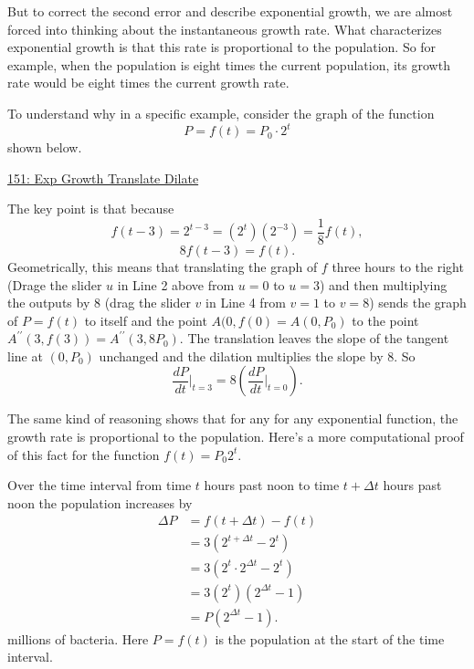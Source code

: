 \documentclass{ximera}
\begin{document}
But to correct the second error and describe exponential growth, we are almost forced into thinking about the instantaneous growth rate. What characterizes exponential growth is that this rate is proportional to the population. So for example, when the population is eight times the current population, its growth rate would be eight times the current growth rate.

To understand why in a specific example, consider the graph of the function
\[
     P = f(t)  = P_0 \cdot 2^t  
\]
shown below. 

\href{https://www.desmos.com/calculator/dmdpvei3d6}{151: Exp Growth Translate Dilate} 
 
\begin{onlineOnly}
    \begin{center}
\end{center}
\end{onlineOnly}



The key point is that because
\[
 f(t-3) =  2^{t-3} = (2^t)(2^{-3}) = \frac{1}{8} f(t) , 
\]
\[
      8 f(t-3) = f(t).
\]
Geometrically, this means that translating the graph of $f$ three hours to the right (Drage the slider $u$ in Line 2 above from $u=0$ to $u=3$) and then multiplying the outputs by $8$ (drag the slider $v$ in Line 4 from $v=1$ to $v=8$) sends the graph of $P=f(t)$ to itself and the point $A(0,f(0) = A(0,P_0)$ to the point $A^{\prime\prime}(3,f(3)) = A^{\prime\prime}(3,8P_0)$. The translation leaves the slope of the tangent line at $(0,P_0)$ unchanged and the dilation multiplies the slope by $8$. So
\[
  \frac{dP}{dt}\Big|_{t=3} = 8 \left( \frac{dP}{dt}\Big|_{t=0} \right).
\]

The same kind of reasoning shows that for any for any exponential function, the growth rate is proportional to the population. Here's a more computational proof of this fact for the function $f(t)=P_0 2^t$.


Over the time interval from time $t$ hours past noon to time $t+\Delta t$ hours past noon the population increases by 
\begin{align*}
  \Delta P &=  f(t + \Delta t) - f(t)  \\ 
                               &=  3 (2^{t+\Delta t} - 2^t) \\
                               &=  3 (2^t \cdot 2^{\Delta t} - 2^t) \\
                               &=  3 (2^t) (2^{\Delta t} - 1)  \\
                               &= P (2^{\Delta t} - 1) .
\end{align*}
millions of bacteria. Here $P=f(t)$ is the population at the start of the time interval.
\end{document}
